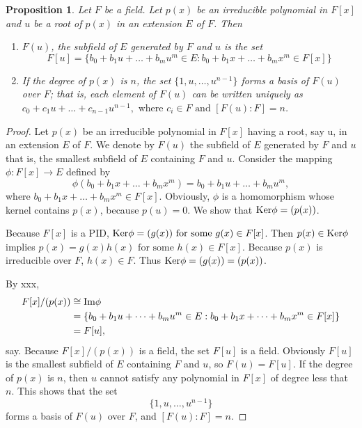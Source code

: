\documentclass[draft]{article}
\newtheorem{prop}[thm]{Proposition}
\theoremstyle{definition}
\theoremstyle{remark}
\begin{document}
			\begin{prop}
				Let $F$ be a field. Let $p(x)$ be an irreducible polynomial in $F[x]$ and $u$ be a root of $p(x)$ in an extension $E$ of $F$. Then
				\begin{enumerate}
				\renewcommand{\labelenumi}{(\roman{enumi})}
					\item $F(u)$, the subfield of $E$ generated by $F$ and $u$ is the set
					\begin{equation*}
					    F[u] = \{b_0 + b_1u + \dots + b_{m}u^m \in E : b_0 + b_1x + \dots + b_{m}x^m \in F[x] \}
					\end{equation*}
					\item If the degree of $p(x)$ is $n$, the set $\{1, u, \dots, u^{n - 1}\}$ forms a basis of $F(u)$ over $F$; that is, each element of $F(u)$ can be written uniquely as\\$c_0 + c_1u + \dots + c_{n - 1}u^{n - 1}, \text{ where } c_i \in F \text{ and } [F(u):F] = n$.
				\end{enumerate}
			\end{prop}
			
			\begin{proof}
			    Let $p(x)$ be an irreducible polynomial in $F[x]$ having a root, say u, in an extension $E$ of $F$. We denote by $F(u)$ the subfield of $E$ generated by $F$ and $u$ that is, the smallest subfield of $E$ containing $F$ and $u$. Consider the mapping $\phi : F[x] \to E$ defined by
			    \begin{equation*}
			        \phi(b_0 + b_1x + \dots + b_mx^m) = b_0 + b_1u + \dots + b_mu^m,
			    \end{equation*}
			    where $b_0 + b_1x + \dots + b_mx^m \in F[x]$. Obviously, $\phi$ is a homomorphism whose kernel contains $p(x)$, because $p(u) = 0$. We show that $\textup{Ker}\phi = (p(x))$.\par
			    Because $F[x]$ is a PID, $\textup{Ker}\phi = (g(x)) \text{ for some } g(x) \in F[x]$. Then $p(x) \in \textup{Ker}\phi$ implies $p(x) = g(x)h(x) \text{ for some } h(x) \in F[x]$. Because $p(x)$ is irreducible over $F$, $h(x) \in F$. Thus $\textup{Ker}\phi = (g(x)) = (p(x))$.\par
			    By xxx,
			    \begin{align*}
			        F[x]/(p(x)) &\cong \textup{Im}\phi\\
			        &= \{b_0 + b_1u + \dots + b_mu^m \in E : b_0 + b_1x + \dots + b_mx^m \in F[x]\}\\
			        &= F[u],
			    \end{align*}
			    say. Because $F[x]/(p(x))$ is a field, the set $F[u]$ is a field. Obviously $F[u]$ is the smallest subfield of $E$ containing $F$ and $u$, so $F(u) = F[u]$. If the degree of $p(x)$ is $n$, then $u$ cannot satisfy any polynomial in $F[x]$ of degree less that $n$. This shows that the set
			    \begin{equation*}
			        \{1, u, \dots, u^{n - 1}\}
			    \end{equation*}
			    forms a basis of $F(u)$ over $F$, and $[F(u) : F] = n$.
			\end{proof}
			
\end{document}
